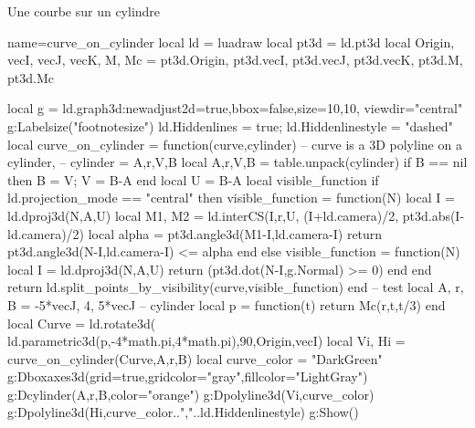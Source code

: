 \begin{demo}{Une courbe sur un cylindre}
\begin{luadraw}{name=curve_on_cylinder}
local ld = luadraw
local pt3d = ld.pt3d
local Origin, vecI, vecJ, vecK, M, Mc = pt3d.Origin, pt3d.vecI, pt3d.vecJ, pt3d.vecK, pt3d.M, pt3d.Mc

local g = ld.graph3d:new{adjust2d=true,bbox=false,size={10,10}, viewdir="central"}
g:Labelsize("footnotesize")
ld.Hiddenlines = true; ld.Hiddenlinestyle = "dashed"
local curve_on_cylinder = function(curve,cylinder)
-- curve is a 3D polyline on a cylinder,
-- cylinder = {A,r,V,B}
    local A,r,V,B = table.unpack(cylinder)
    if B == nil then B = V; V = B-A end
    local U = B-A
    local visible_function
    if ld.projection_mode == "central" then
        visible_function = function(N)
            local I = ld.dproj3d(N,{A,U})
            local M1, M2 = ld.interCS({I,r,U},{ (I+ld.camera)/2, pt3d.abs(I-ld.camera)/2})
            local alpha = pt3d.angle3d(M1-I,ld.camera-I)
            return pt3d.angle3d(N-I,ld.camera-I) <= alpha
        end
    else
        visible_function = function(N)
            local I = ld.dproj3d(N,{A,U})
            return (pt3d.dot(N-I,g.Normal) >= 0)
        end
    end
    return ld.split_points_by_visibility(curve,visible_function)
end
-- test
local A, r, B = -5*vecJ, 4, 5*vecJ -- cylinder
local p = function(t) return Mc(r,t,t/3) end
local Curve = ld.rotate3d( ld.parametric3d(p,-4*math.pi,4*math.pi),90,{Origin,vecI})
local Vi, Hi = curve_on_cylinder(Curve,{A,r,B})
local curve_color = "DarkGreen"
g:Dboxaxes3d({grid=true,gridcolor="gray",fillcolor="LightGray"})
g:Dcylinder(A,r,B,{color="orange"})
g:Dpolyline3d(Vi,curve_color)
g:Dpolyline3d(Hi,curve_color..","..ld.Hiddenlinestyle)
g:Show()
\end{luadraw}
\end{demo}
